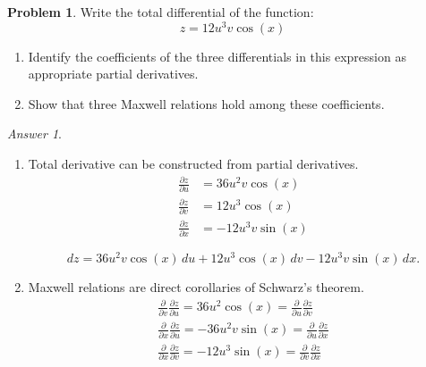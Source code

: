 \documentclass[a4paper, 12pt]{article}
\theoremstyle{definition}
\newtheorem{problem}{Problem}[section]
\theoremstyle{remark}
\newtheorem*{answer}{Answer}
\begin{document}
\begin{problem}
    Write the total differential of the function:
    \[ z = 12 u^3 v \cos(x) \]

    \begin{enumerate}
        \item Identify the coefficients of the three differentials in this
            expression as appropriate partial derivatives.
        \item Show that three Maxwell relations hold among these coefficients.
    \end{enumerate}

    \begin{answer}
        \begin{enumerate}
            \item Total derivative can be constructed from partial derivatives.
                \begin{align*}
                    \frac{\partial z}{\partial u} &= 36 u^2 v \cos(x) \\
                    \frac{\partial z}{\partial v} &= 12 u^3 \cos(x) \\
                    \frac{\partial z}{\partial x} &= -12 u^3 v \sin(x)
                \end{align*}

                \[ dz = 36 u^2 v \cos(x) \,du
                    + 12 u^3 \cos(x) \,dv
                    - 12 u^3 v \sin(x) \,dx.\]

            \item Maxwell relations are direct corollaries of Schwarz's theorem.
                \[
                    \begin{gathered}
                        \frac\partial{\partial v}\frac{\partial z}{\partial u}
                            = 36 u^2 \cos(x)
                            = \frac\partial{\partial u}\frac{\partial z}{\partial v} \\
                        \frac\partial{\partial x}\frac{\partial z}{\partial u}
                            = -36 u^2 v \sin(x)
                            = \frac\partial{\partial u}\frac{\partial z}{\partial x} \\
                        \frac\partial{\partial x}\frac{\partial z}{\partial v}
                            = -12 u^3 \sin(x)
                            = \frac\partial{\partial v}\frac{\partial z}{\partial x} \\
                    \end{gathered}
                \]
        \end{enumerate}
    \end{answer}
\end{problem}
\end{document}
